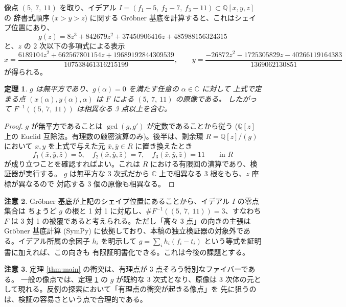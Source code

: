 \documentclass[paper=a4,fontsize=10.5pt,jafontsize=10.5pt]{jlreq}
\theoremstyle{plain}
\newtheorem{theorem}{定理}[section]
\theoremstyle{definition}
\newtheorem{remark}[theorem]{注意}
\begin{document}
像点 $(5,\ 7,\ 11)$ を取り、イデアル
$I = (f_1 - 5,\ f_2 - 7,\ f_3 - 11) \subset \mathbb{Q}[x,y,z]$ の
辞書式順序 ($x > y > z$) に関する Gr\"obner 基底を計算すると、これはシェイプ位置にあり、
\[
  g(z) = 8z^{3} + 842679z^{2} + 37450906416z + 485988156324315
\]
と、$z$ の 2 次以下の多項式による表示
\[
  x = \frac{6189104z^{2} + 662567801154z + 19689192844309539}{107538461316215199},
  \qquad
  y = \frac{- 26872z^{2} - 1725305829z - 40266119164383}{1369062130851}
\]
が得られる。

\begin{theorem}\label{thm:fiber}
$g$ は無平方であり、$g(\alpha) = 0$ を満たす任意の $\alpha \in \mathbb{C}$ に対して
上式で定まる点 $(x(\alpha), y(\alpha), \alpha)$ は $F$ による $(5,\ 7,\ 11)$ の原像である。
したがって $F^{-1}((5,\ 7,\ 11))$ は相異なる 3 点以上を含む。
\end{theorem}

\begin{proof}
$g$ が無平方であることは $\gcd(g, g')$ が定数であることから従う ($\mathbb{Q}[z]$ 上の
Euclid 互除法。有理数の厳密演算のみ)。後半は、剰余環 $R = \mathbb{Q}[z]/(g)$ において
$x, y$ を上式で与えた元 $\bar{x}, \bar{y} \in R$ に置き換えたとき
\[
  f_1(\bar{x}, \bar{y}, \bar{z}) = 5,\quad
  f_2(\bar{x}, \bar{y}, \bar{z}) = 7,\quad
  f_3(\bar{x}, \bar{y}, \bar{z}) = 11
  \qquad \text{in } R
\]
が成り立つことを確認すればよい。これは $R$ における有限回の演算であり、検証器が実行する。
$g$ は無平方な 3 次式だから $\mathbb{C}$ 上で相異なる 3 根をもち、$z$ 座標が異なるので
対応する 3 個の原像も相異なる。
\end{proof}

\begin{remark}
Gr\"obner 基底が上記のシェイプ位置にあることから、イデアル $I$ の零点集合は
ちょうど $g$ の根と 1 対 1 に対応し、$\#F^{-1}((5,\ 7,\ 11)) = 3$、すなわち $F$ は
3 対 1 の被覆であると考えられる。ただし「高々 3 点」の向きの主張は Gr\"obner 基底計算
(SymPy) に依拠しており、本稿の独立検証器の対象外である。イデアル所属の余因子
$h_i$ を明示して $g = \sum_i h_i (f_i - t_i)$ という等式を証明書に加えれば、この向きも
有限証明書化できる。これは今後の課題とする。
\end{remark}

\begin{remark}
定理 \ref{thm:main} の衝突は、有理点が 3 点そろう特別なファイバーである。
一般の像点では、定理 \ref{thm:fiber} の $g$ が既約な 3 次式となり、原像は
3 次体の元として現れる。反例の探索において「有理点の衝突が起きる像点」を
先に狙うのは、検証の容易さという点で合理的である。
\end{remark}
\end{document}
